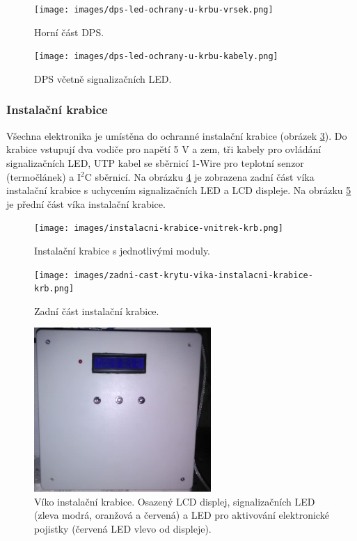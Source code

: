 \begin{figure}[H]
    \centering
    \texttt{[image: images/dps-led-ochrany-u-krbu-vrsek.png]}
    \caption{Horní část DPS.}
    \label{fig:dps-led-ochrany-u-krbu-vrsek}
\end{figure}

\begin{figure}[H]
    \centering
    \texttt{[image: images/dps-led-ochrany-u-krbu-kabely.png]}
    \caption{DPS včetně signalizačních LED.}
    \label{fig:dps-led-ochrany-u-krbu-kabely}
\end{figure}

\subsubsection{Instalační krabice}
Všechna elektronika je umístěna do ochranné instalační krabice (obrázek \ref{fig:instalacni-krabice-vnitrek-krb}). Do krabice vstupují dva vodiče pro napětí 5 V a zem, tři kabely pro ovládání signalizačních LED, UTP kabel se sběrnicí 1-Wire pro teplotní senzor (termočlánek) a I$^2$C sběrnicí. Na obrázku \ref{fig:zadni-cast-krytu-vika-instalacni-krabice-krb} je zobrazena zadní část víka instalační krabice s uchycením signalizačních LED a LCD displeje. Na obrázku \ref{fig:predni-cast-krytu-vika-instalacni-krabice-krb} je přední část víka instalační krabice.

\begin{figure}[H]
    \centering
    \texttt{[image: images/instalacni-krabice-vnitrek-krb.png]}
    \caption{Instalační krabice s jednotlivými moduly.}
    \label{fig:instalacni-krabice-vnitrek-krb}
\end{figure}

\begin{figure}[H]
    \centering
    \texttt{[image: images/zadni-cast-krytu-vika-instalacni-krabice-krb.png]}
    \caption{Zadní část instalační krabice.}
    \label{fig:zadni-cast-krytu-vika-instalacni-krabice-krb}
\end{figure}

\begin{figure}[H]
    \centering
    \includegraphics[width=0.6\textwidth]{images/predni-cast-krytu-vika-instalacni-krabice-krb.png}
    \caption[Víko instalační krabice.]{Víko instalační krabice. Osazený LCD displej, signalizačních LED (zleva modrá, oranžová a červená) a LED pro aktivování elektronické pojistky (červená LED vlevo od displeje).}
    \label{fig:predni-cast-krytu-vika-instalacni-krabice-krb}
\end{figure}

